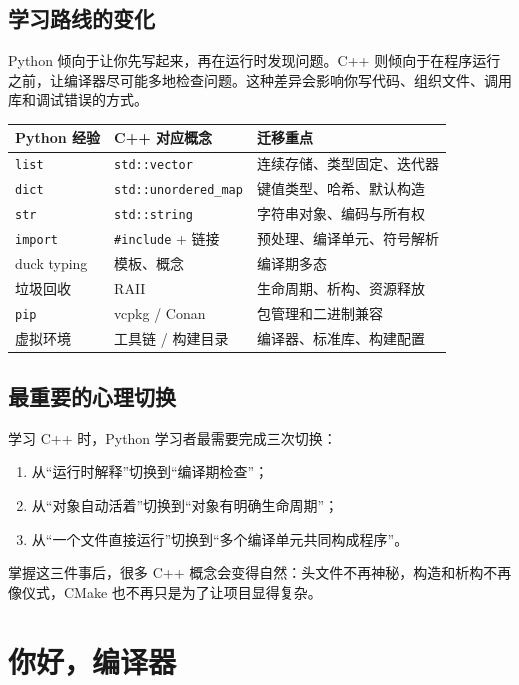 \documentclass[UTF8,openany]{ctexbook}
\begin{document}
\section{学习路线的变化}

Python 倾向于让你先写起来，再在运行时发现问题。C++ 则倾向于在程序运行之前，让编译器尽可能多地检查问题。这种差异会影响你写代码、组织文件、调用库和调试错误的方式。

\begin{center}
\begin{tabular}{lll}
\toprule
Python 经验 & C++ 对应概念 & 迁移重点 \\
\midrule
\texttt{list} & \texttt{std::vector} & 连续存储、类型固定、迭代器 \\
\texttt{dict} & \texttt{std::unordered\_map} & 键值类型、哈希、默认构造 \\
\texttt{str} & \texttt{std::string} & 字符串对象、编码与所有权 \\
\texttt{import} & \texttt{\#include} + 链接 & 预处理、编译单元、符号解析 \\
duck typing & 模板、概念 & 编译期多态 \\
垃圾回收 & RAII & 生命周期、析构、资源释放 \\
\texttt{pip} & vcpkg / Conan & 包管理和二进制兼容 \\
虚拟环境 & 工具链 / 构建目录 & 编译器、标准库、构建配置 \\
\bottomrule
\end{tabular}
\end{center}

\section{最重要的心理切换}

学习 C++ 时，Python 学习者最需要完成三次切换：

\begin{enumerate}[noitemsep]
  \item 从“运行时解释”切换到“编译期检查”；
  \item 从“对象自动活着”切换到“对象有明确生命周期”；
  \item 从“一个文件直接运行”切换到“多个编译单元共同构成程序”。
\end{enumerate}

掌握这三件事后，很多 C++ 概念会变得自然：头文件不再神秘，构造和析构不再像仪式，CMake 也不再只是为了让项目显得复杂。

\chapter{你好，编译器}
\end{document}
